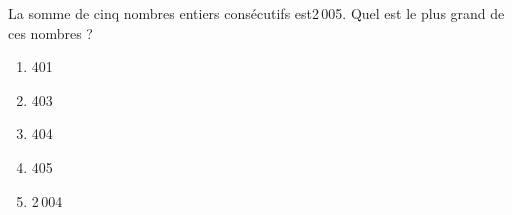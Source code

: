 La somme de cinq nombres entiers consécutifs est2\,005. Quel est le plus grand de ces nombres ?
\begin{multicols}{5}
  \begin{enumerate}[A/]
  \item 401
  \item 403
  \item 404
  \item 405
  \item 2\,004
  \end{enumerate}
\end{multicols}